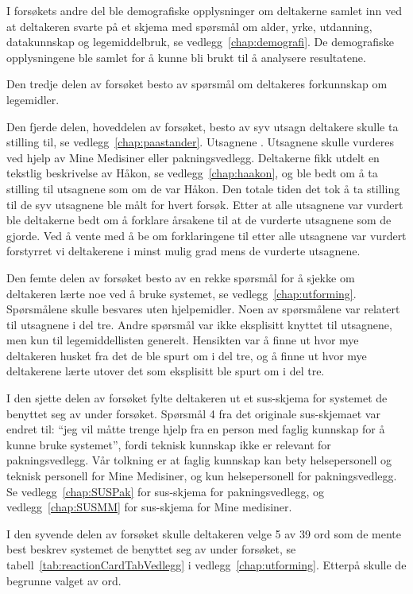 I forsøkets andre del ble demografiske opplysninger om deltakerne samlet inn ved at deltakeren svarte på et skjema med spørsmål om alder, yrke, utdanning, datakunnskap og legemiddelbruk, se vedlegg~\ref{chap:demografi}. De demografiske opplysningene ble samlet for å kunne bli brukt til å analysere resultatene.

Den tredje delen av forsøket besto av spørsmål om deltakeres forkunnskap om legemidler. 

Den fjerde delen, hoveddelen av forsøket, besto av syv utsagn deltakere skulle ta stilling til, se vedlegg~\ref{chap:paastander}. Utsagnene . 
Utsagnene skulle vurderes ved hjelp av Mine Medisiner eller pakningsvedlegg. Deltakerne fikk utdelt en tekstlig beskrivelse av Håkon, se vedlegg~\ref{chap:haakon}, og ble bedt om å ta stilling til utsagnene som om de var Håkon. Den totale tiden det tok å ta stilling til de syv utsagnene ble målt for hvert forsøk. Etter at alle utsagnene var vurdert ble deltakerne bedt om å forklare årsakene til at de vurderte utsagnene som de gjorde. Ved å vente med å be om forklaringene til etter alle utsagnene var vurdert forstyrret vi deltakerene i minst mulig grad mens de vurderte utsagnene.

Den femte delen av forsøket besto av en rekke spørsmål for å sjekke om deltakeren lærte noe ved å bruke systemet, se vedlegg~\ref{chap:utforming}. Spørsmålene skulle besvares uten hjelpemidler. Noen av spørsmålene var relatert til utsagnene i del tre. Andre spørsmål var ikke eksplisitt knyttet til utsagnene, men kun til legemiddellisten generelt. Hensikten var å finne ut hvor mye deltakeren husket fra det de ble spurt om i del tre, og å finne ut hvor mye deltakerene lærte utover det som eksplisitt ble spurt om i del tre. 

I den sjette delen av forsøket fylte deltakeren ut et \acrshort{sus}-skjema for systemet de benyttet seg av under forsøket. Spørsmål 4 fra det originale \acrshort{sus}-skjemaet var endret til: “jeg vil måtte trenge hjelp fra en person med faglig kunnskap for å kunne bruke systemet”, fordi teknisk kunnskap ikke er relevant for pakningsvedlegg. Vår tolkning er at faglig kunnskap kan bety helsepersonell og teknisk personell for Mine Medisiner, og kun helsepersonell for pakningsvedlegg. Se vedlegg~\ref{chap:SUSPak} for \acrshort{sus}-skjema for pakningsvedlegg, og vedlegg~\ref{chap:SUSMM} for \acrshort{sus}-skjema for Mine medisiner.

I den syvende delen av forsøket skulle deltakeren velge 5 av 39 ord som de mente best beskrev systemet de benyttet seg av under forsøket, se tabell~\ref{tab:reactionCardTabVedlegg} i vedlegg~\ref{chap:utforming}. Etterpå skulle de begrunne valget av ord.


